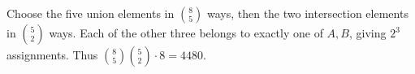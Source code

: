Choose the five union elements in $\binom85$ ways, then the two intersection elements in $\binom52$ ways. Each of the other three belongs to exactly one of $A,B$, giving $2^3$ assignments. Thus $\binom85\binom52\cdot8=\boxed{4480}$.
